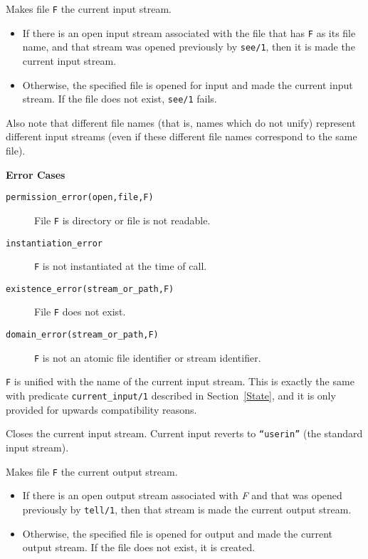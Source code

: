 \begin{description}
    Makes file {\tt F} the current input stream. 
    \begin{itemize}
    \item If there is an open input stream associated with the file that 
          has {\tt F} as its file name, and that stream was opened previously
	  by {\tt see/1}, then it is made the current input stream.
    \item Otherwise, the specified file is opened for input and made the
          current input stream. If the file does not exist, {\tt see/1} 
	  fails.
    \end{itemize}
    Also note that different file names (that is, names which do not unify) 
    represent different input streams (even if these different file names 
    correspond to the same file).

{\bf Error Cases}
    \begin{description}
    \item[{\tt permission\_error(open,file,F)}]
    	File {\tt F} is directory or file is not readable. 
    \item[{\tt instantiation\_error}]
    	{\tt F} is not instantiated at the time of call. 
    \item[{\tt existence\_error(stream\_or\_path,F)}]
    	File {\tt F} does not exist. 
    \item[{\tt domain\_error(stream\_or\_path,F)}]
    	{\tt F} is not an atomic file identifier or stream identifier.
    \end{description}

    {\tt F} is unified with the name of the current input stream.
    This is exactly the same with predicate {\tt current\_input/1}
    described in Section~\ref{State}, and it is only provided for
    upwards compatibility reasons.

    Closes the current input stream. 
    Current input reverts to {\tt ``userin''} (the standard input stream).

    Makes file {\tt F} the current output stream. 
    \begin{itemize}
    \item If there is an open output stream associated with {\em F}  
          and that was opened previously 
          by {\tt tell/1}, then that stream is made the current output 
	  stream. 
    \item Otherwise, the specified file is opened for output and made the
          current output stream. If the file does not exist, it is created.
    \end{itemize}


\end{description}
